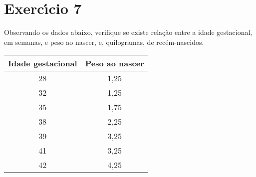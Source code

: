 \documentclass[a4paper,11pt,twoside,openright]{report}
\begin{document}
\section*{Exerc\'{\i}cio 7}
\hspace{0.5cm}Observando os dados abaixo, verifique se existe rela\c{c}\~{a}o entre a idade gestacional, em semanas, e peso ao nascer, e, 
quilogramas, de rec\'{e}m-nascidos.

\begin{center}
\begin{tabular}{l|l}
\hline
\multicolumn{1}{c|}{Idade gestacional} & \multicolumn{1}{c}{Peso ao nascer} \\ 
\hline
\multicolumn{1}{c|}{28} & \multicolumn{1}{c}{1,25} \\ 
\multicolumn{1}{c|}{32} & \multicolumn{1}{c}{1,25} \\ 
\multicolumn{1}{c|}{35} & \multicolumn{1}{c}{1,75} \\ 
\multicolumn{1}{c|}{38} & \multicolumn{1}{c}{2,25} \\ 
\multicolumn{1}{c|}{39} & \multicolumn{1}{c}{3,25} \\ 
\multicolumn{1}{c|}{41} & \multicolumn{1}{c}{3,25} \\ 
\multicolumn{1}{c|}{42} & \multicolumn{1}{c}{4,25} \\ 
\hline
\end{tabular}
\end{center}


\\
\end{document}
